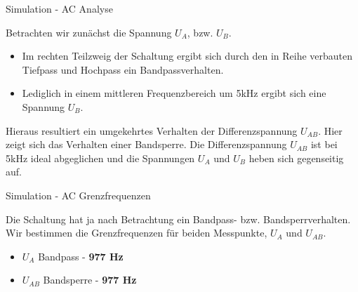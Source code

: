 \begin{frame}[t]{Simulation - AC Analyse}

  Betrachten wir zunächst die Spannung $U_A$, bzw. $U_B$.

  \begin{itemize}
    \item Im rechten Teilzweig der Schaltung ergibt sich durch den in Reihe verbauten Tiefpass und Hochpass ein Bandpassverhalten.
    \item Lediglich in einem mittleren Frequenzbereich um 5kHz ergibt sich eine Spannung $U_{B}$.
  \end{itemize}

  Hieraus resultiert ein umgekehrtes Verhalten der Differenzspannung $U_{AB}$. Hier zeigt sich das Verhalten einer Bandsperre.
  Die Differenzspannung $U_{AB}$ ist bei 5kHz ideal abgeglichen und die Spannungen $U_{A}$ und $U_{B}$ heben sich gegenseitig auf.
\end{frame}

\begin{frame}[t]{Simulation - AC Grenzfrequenzen}

  Die Schaltung hat ja nach Betrachtung ein Bandpass- bzw. Bandsperrverhalten. Wir bestimmen die Grenzfrequenzen für beiden Messpunkte, $U_A$ und $U_{AB}$.
  \begin{itemize}
    \item $U_A$ Bandpass - \textbf{977 Hz}
    \item $U_{AB}$ Bandsperre - \textbf{977 Hz}
  \end{itemize}

  \begin{figure}
    \centering
    \qquad
  \end{figure}

\end{frame}

